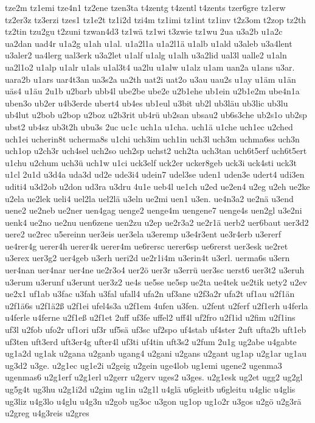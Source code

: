 {tze2m
tz1emi
tze4n1
tz2ene
tzen3ta
t4zentg
t4zentl
t4zents
tzer6gre
tz1erw
tz2er3z
tz3erzi
tzes1
tz1e2t
tz1i2d
tzi4m
tz1imi
tz1int
tz1inv
t2z3om
t2zop
tz2th
tz2tin
tzu2gu
t2zuni
tzwan4d3
tz1wä
tz1wi
t3zwie
tz1wu
2ua
u3a2b
u1a2c
ua2dan
uad4r
u1a2g
u1ah
u1al.
u1a2l1a
u1a2l1ä
u1alb
u1ald
u3aleb
u3a4lent
u3aler2
ua4lerg
ual3erk
u3a2let
u1alf
u1alg
u1alh
u3a2lid
ual3l
ualle2
u1aln
ua2l1o2
u1alp
u1alr
u1als
u1al3t4
ua2lu
u1alw
u1alz
u1am
uan2a
u1ans
u3ar.
uara2b
u1ars
uar4t3an
ua3s2a
ua2th
uat2i
uat2o
u3au
uau2s
u1ay
u1äm
u1än
uäs4
u1äu
2u1b
u2barb
ubb4l
ube2be
ube2e
u2b1ehe
ub1ein
u2b1e2m
ube4n1a
uben3o
ub2er
u4b3erde
ubert4
ub4es
ub1eul
u3bit
ub2l
ub3läu
ub3lic
ub3lu
ub4lut
u2bob
u2bop
u2boz
u2b3rit
ub4rü
ub2san
ubsau2
ub6s3che
ub2s1o
ub2sp
ubst2
ub4sz
ub3t2h
ubu3s
2uc
uc1c
uch1a
u1cha.
uch1ä
u1che
uch1ec
u2ched
uch1ei
ucherin8t
ucherma8s
u1chi
uch3im
uch1in
uch3l
uch3m
uchma6ss
uch3n
uch1op
u2ch3r
uch4sel
uch2so
uch2sp
uchst2
uch2ta
uch3tan
uch6t5erf
uch6t5ert
u1chu
u2chum
uch3ü
uch1w
u1ci
uck3elf
uck2er
ucker8geb
uck3i
uck4sti
uck3t
u1cl
2u1d
u3d4a
uda3d
ud2e
ude3i4
udein7
udel3se
uden1
uden3e
udert4
udi3en
uditi4
u3d2ob
u2don
ud3ra
u3dru
4u1e
ueb4l
ue1ch
u2ed
ue2en4
u2eg
u2eh
ue2ke
u2ela
ue2lek
ueli4
uel2la
uel2lä
u3eln
ue2mi
uen1
u3en.
ue4n3a2
ue2nä
u3end
uene2
ue2neb
ue2ner
uen4gag
uenge2
uenge4m
uengene7
uenge4s
uen2gl
u3e2ni
uenk4
ue2no
ue2nu
uen6zene
uen2zu
u2ep
ue2r3a2
ue2r1ä
uerb2
uer6baut
uer3d2
uere2
ue2rec
u5ereinn
uer3eis
uer3ela
u3eremp
u3e4r3ent
ue3r4erb
u3ererf
ue4rer4g
uerer4h
uerer4k
uerer4m
ue6rersc
uerer6sp
ue6rerst
uer3esk
ue2ret
u3erex
uer3g2
uer4geb
u3erh
ueri2d
ue2r1i4m
u3erin4t
u3erl.
uerma6s
u3ern
uer4nan
uer4nar
uer4ne
ue2r3o4
uer2ö
uer3r
u3errü
uer3sc
uerst6
uer3t2
u3eruh
u3erum
u3erunf
u3erunt
uer3z2
ue4s
ue5se
ue5sp
ue2ta
ue4tek
ue2tik
uety2
u2ev
ue2x1
uf1ab
u3fac
u3fah
u3fal
ufall4
ufa2n
uf3ane
u2f3a2r
ufa2t
uf1au
u2f1än
u2f1ä6s
u2f1ä2ß
u2f1ei
ufel4s3a
u2f1em
4ufen
u3fen.
u2fent
u2ferf
u2f1erh
u4ferla
u4ferle
u4ferne
u2f1eß
u2f1et
2uff
uf3fe
uffel2
uff4l
uf2fro
u2f1id
u2fim
u2f1ins
uf3l
u2fob
ufo2r
uf1ori
uf3r
uf5sä
uf3sc
uf2spo
uf4stab
uf4ster
2uft
ufta2b
uft1eb
uf3ten
uft3erd
uft3er4g
ufter4l
uf3ti
uf4tin
uft3s2
u2fum
2u1g
ug2abe
u4gabte
ug1a2d
ug1ak
u2gana
u2ganb
ugang4
u2gani
u2gans
u2gant
ug1ap
u2g1ar
ug1au
ug3d2
u3ge.
u2g1ec
ug1e2i
u2geig
u2gein
uge4lob
ug1emi
ugene2
ugenma3
ugenmas6
u2g1erf
u2g1erl
u2gerr
u2gerv
uges2
u3ges.
u2g1esk
ug2et
ugg2
ug2gl
ug5g4t
ug3hu
u2g1i2d
u2gim
ug1in
u2g1l
u4glä
u6gleitb
u6gleitu
u4glic
u4glis
ug3liz
u4g3lo
u4glu
u4g3n
u2gob
ug3oc
u3gon
ug1op
ug1o2r
u3gos
u2gö
u2g3rä
u2greg
u4g3reis
u2gres
}
